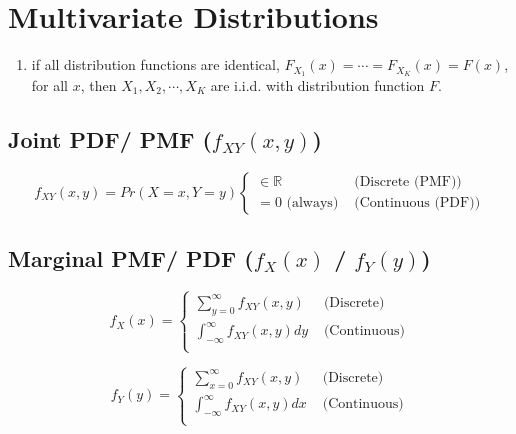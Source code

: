 

\section{Multivariate Distributions \cite{ism-1,mfml-1}} \label{Multivariate Distributions}

\begin{enumerate}
     \item if all distribution functions are identical, $F_{X_1}(x)=\cdots=F_{X_K}(x)=F(x)$, for all $x$, then $X_1, X_2,\cdots,X_K$ are i.i.d. with distribution function $F$.
\end{enumerate}

\subsection{Joint PDF/ PMF ($f_{XY}(x, y)$) \cite{ism-1}}\label{Joint PDF/ PMF}

\[
    f_{XY}(x, y) 
    = Pr(X = x, Y = y)
    \begin{cases}
        \in \mathbb{R} & \text{ (Discrete (PMF))}\\
        = 0 \text{ (always)} & \text{ (Continuous (PDF))}
    \end{cases}
\]

\subsection{Marginal PMF/ PDF ($f_X(x)$ / $f_Y(y)$) \cite{ism-1,mfml-1}}\label{Marginal PMF/ PDF}

\begin{table}[H]
    \begin{minipage}{0.49\linewidth}
        \[
            f_X(x)
            = \begin{cases}
                \displaystyle\sum_{y=0}^\infty f_{XY}(x,y) & \text{ (Discrete)}\\[2ex]
                \displaystyle\int_{-\infty}^\infty f_{XY}(x,y) dy & \text{ (Continuous)}\\
            \end{cases}
        \]
    \end{minipage}
    \hfill
    \begin{minipage}{0.49\linewidth}
        \[
            f_Y(y)
            = \begin{cases}
                \displaystyle\sum_{x=0}^\infty f_{XY}(x,y) & \text{ (Discrete)}\\[2ex]
                \displaystyle\int_{-\infty}^\infty f_{XY}(x,y) dx & \text{ (Continuous)}\\
            \end{cases}
        \]
    \end{minipage}
\end{table}

